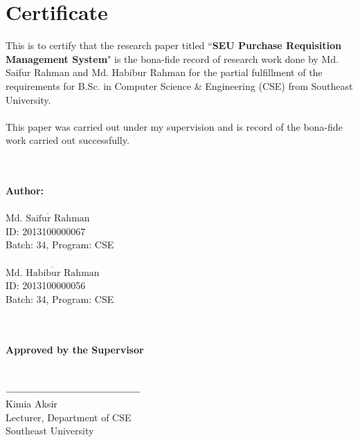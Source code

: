 \documentclass[12pt]{report} %
\begin{document}
\thispagestyle{empty}
\clearpage






\section*{Certificate}
This is to certify that the research paper titled ``\textbf{SEU Purchase Requisition Management System}" is the bona-fide record of research work done by Md. Saifur Rahman and Md. Habibur Rahman for the partial fulfillment of the requirements for B.Sc. in Computer Science \& Engineering (CSE) from Southeast University.\\~\\
This paper was carried out under my supervision and is record of the bona-fide work carried out successfully.\\~\\~\\
\begin{minipage}[t]{0.5\textwidth}

\textbf{Author:}\\~\\
$\overline{\text{Md. Saifur Rahman}}$\\
ID: 2013100000067\\
Batch: 34,  Program: CSE\\
\\
$\overline
{\text{Md. Habibur Rahman}}$\\
ID: 2013100000056\\
Batch: 34,  Program: CSE\\
\\~\\

\end{minipage}
\begin{minipage}[t]{0.5\textwidth}

\begin{center}
\textbf{Approved by the Supervisor}\\~\\~\\
$\overline{\text{}\mkern 250mu}$\\
Kimia Aksir\\
Lecturer, Department of CSE\\
Southeast University
\end{center}
\end{minipage}
\end{document}
